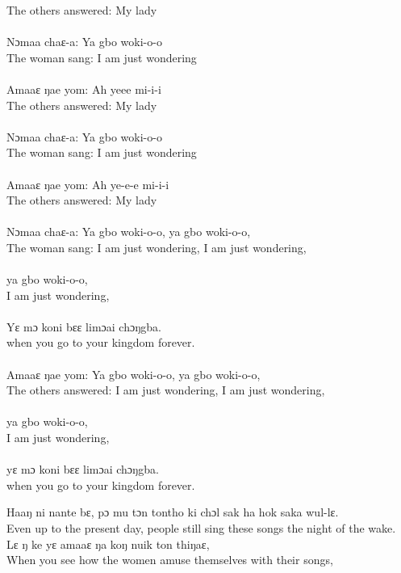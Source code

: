 \begin{tabbing}
The others answered: \>   My lady\\
\\
Nɔmaa chaɛ-a:     \>     Ya gbo woki-o-o\\
The woman sang:   \>     I am just wondering\\
\\
Amaaɛ ŋae yom:  \>    Ah yeee mi-i-i\\
The others answered: \>    My lady\\
\\
Nɔmaa chaɛ-a:   \>      Ya gbo woki-o-o\\
The woman sang:   \>     I am just wondering\\
\\
Amaaɛ ŋae yom:   \>     Ah ye-e-e mi-i-i\\
The others answered: \>    My lady\\
\\
Nɔmaa chaɛ-a:     \>      Ya gbo woki-o-o, ya gbo woki-o-o,\\ 
The woman sang:     \>   I am just wondering, I am just wondering,\\
\\
\> ya gbo woki-o-o,\\
\> I am just wondering,\\
\\
\> Yɛ mɔ koni bɛɛ limɔai chɔŋgba.\\
\>  when you go to your kingdom forever.\\
\\
Amaaɛ ŋae yom:     \>    Ya gbo woki-o-o, ya gbo woki-o-o,\\ 
The others answered:   \> I am just wondering, I am just wondering,\\ 
\\
\> ya gbo woki-o-o,\\
\>  I am just wondering,\\
\\
\> yɛ mɔ koni bɛɛ limɔai chɔŋgba.\\
\> when you go to your kingdom forever.\\
\end{tabbing}

Haaŋ ni nante bɛ, pɔ mu tɔn tontho ki chɔl sak ha hok saka wul-lɛ.\\
Even up to the present day, people still sing these songs the night of the wake.\\

Lɛ ŋ ke yɛ amaaɛ ŋa koŋ nuik ton thiŋaɛ,\\ 
When you see how the women amuse themselves with their songs,\\ 

